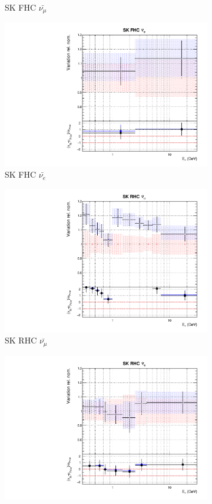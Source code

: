 \begin{figure}
\begin{subfigure}{0.24\textwidth}
  \caption{SK FHC $\bar{\nu_{\mu}}$}
\end{subfigure}
\begin{subfigure}{0.24\textwidth}
  \centering
  \includegraphics[width=0.95\linewidth]{figs/fixed2p2hflux11}
  \caption{SK FHC $\bar{\nu_{e}}$}
\end{subfigure}
\begin{subfigure}{0.24\textwidth}
  \centering
  \includegraphics[width=0.95\linewidth]{figs/fixed2p2hflux12}
  \caption{SK RHC $\bar{\nu_{\mu}}$}
\end{subfigure}
\begin{subfigure}{0.24\textwidth}
  \centering
  \includegraphics[width=0.95\linewidth]{figs/fixed2p2hflux13}

\end{subfigure}
\end{figure}
